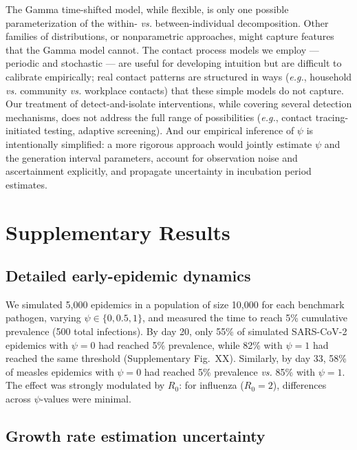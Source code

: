 \documentclass[10pt]{article}
\makeatletter
\newcommand{\eg}{\textit{e.g.}\@\xspace}
\newcommand{\vs}{\textit{vs.}\@\xspace}
\makeatother
\begin{document}
The Gamma time-shifted model, while flexible, is only one possible parameterization of the within- \vs between-individual decomposition. Other families of distributions, or nonparametric approaches, might capture features that the Gamma model cannot. The contact process models we employ --- periodic and stochastic --- are useful for developing intuition but are difficult to calibrate empirically; real contact patterns are structured in ways (\eg, household \vs community \vs workplace contacts) that these simple models do not capture. Our treatment of detect-and-isolate interventions, while covering several detection mechanisms, does not address the full range of possibilities (\eg, contact tracing-initiated testing, adaptive screening). And our empirical inference of $\psi$ is intentionally simplified: a more rigorous approach would jointly estimate $\psi$ and the generation interval parameters, account for observation noise and ascertainment explicitly, and propagate uncertainty in incubation period estimates.


\section{Supplementary Results}
\label{sec:supp_results}

\subsection{Detailed early-epidemic dynamics}

We simulated 5,000 epidemics in a population of size 10,000 for each benchmark pathogen, varying $\psi \in \{0, 0.5, 1\}$, and measured the time to reach 5\% cumulative prevalence (500 total infections). By day 20, only 55\% of simulated SARS-CoV-2 epidemics with $\psi = 0$ had reached 5\% prevalence, while 82\% with $\psi = 1$ had reached the same threshold (Supplementary Fig.~XX). Similarly, by day 33, 58\% of measles epidemics with $\psi = 0$ had reached 5\% prevalence \vs 85\% with $\psi = 1$. The effect was strongly modulated by $R_0$: for influenza ($R_0 = 2$), differences across $\psi$-values were minimal.

\subsection{Growth rate estimation uncertainty}
\end{document}
